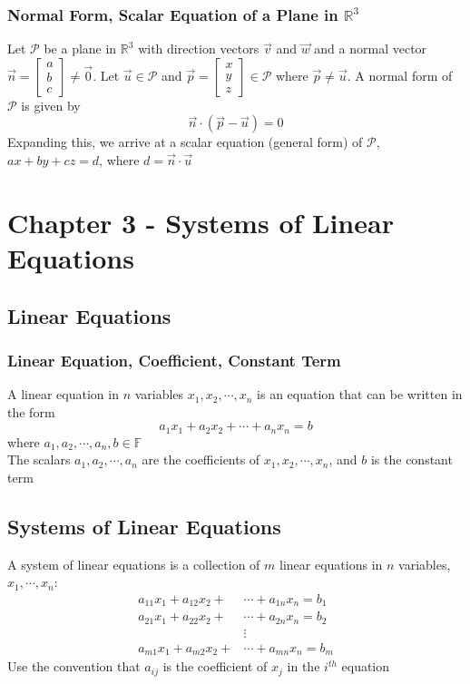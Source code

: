 \documentclass[12pt, letterpaper]{article}
\begin{document}
\subsubsection{Normal Form, Scalar Equation of a Plane in $\mathbb{R}^3$}
Let $\mathcal{P}$ be a plane in $\mathbb{R}^3$ with direction vectors $\vec{v}$ and $\vec{w}$ and a 
normal vector $\vec{n} = \begin{bmatrix}
    a \\ b \\ c
\end{bmatrix} \neq\vec{0}$. Let $\vec{u}\in\mathcal{P}$ and $\vec{p} = \begin{bmatrix}
    x \\ y \\ z
\end{bmatrix} \in\mathcal{P}$ where $\vec{p}\neq\vec{u}$. A normal form of $\mathcal{P}$ is given by 
\[\vec{n}\cdot(\vec{p}-\vec{u})=0\]
Expanding this, we arrive at a scalar equation (general form) of $\mathcal{P}$, $ax+by+cz = d$, where $d=\vec{n}\cdot\vec{u}$

\section{Chapter 3 - Systems of Linear Equations}
\subsection{Linear Equations}
\subsubsection{Linear Equation, Coefficient, Constant Term}
A linear equation in $n$ variables $x_1, x_2, \cdots, x_n$ is an equation that can be written in the form 
\[a_1x_1 + a_2x_2 + \cdots + a_nx_n = b\]
where $a_1, a_2, \cdots, a_n, b\in\mathbb{F}$ \\
The scalars $a_1, a_2, \cdots, a_n$ are the coefficients of $x_1, x_2, \cdots, x_n$, and $b$ is the constant term 
\subsection{Systems of Linear Equations}
A system of linear equations is a collection of $m$ linear equations in $n$ variables, $x_1, \cdots, x_n$: 
\begin{align*}
    a_{11}x_1 + a_{12}x_2 + &\cdots + a_{1n}x_n = b_1 \\
    a_{21}x_1 + a_{22}x_2 + &\cdots + a_{2n}x_n = b_2 \\
    &\vdots \\
    a_{m1}x_1 + a_{m2}x_2 + &\cdots + a_{mn}x_n = b_m
\end{align*}
Use the convention that $a_{ij}$ is the coefficient of $x_j$ in the $i^{th}$ equation 
\end{document}
